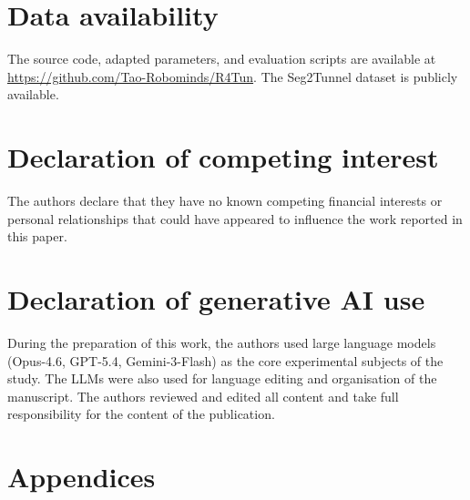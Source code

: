 \documentclass[a4paper,fleqn]{cas-dc}
\begin{document}
\section*{Data availability}

The source code, adapted parameters, and evaluation scripts are available at \url{https://github.com/Tao-Robominds/R4Tun}. The Seg2Tunnel dataset is publicly available.

\section*{Declaration of competing interest}

The authors declare that they have no known competing financial interests or personal relationships that could have appeared to influence the work reported in this paper.

\section*{Declaration of generative AI use}

During the preparation of this work, the authors used large language models (Opus-4.6, GPT-5.4, Gemini-3-Flash) as the core experimental subjects of the study. The LLMs were also used for language editing and organisation of the manuscript. The authors reviewed and edited all content and take full responsibility for the content of the publication.



\section*{Appendices}





\clearpage %

\balance


\end{document}
